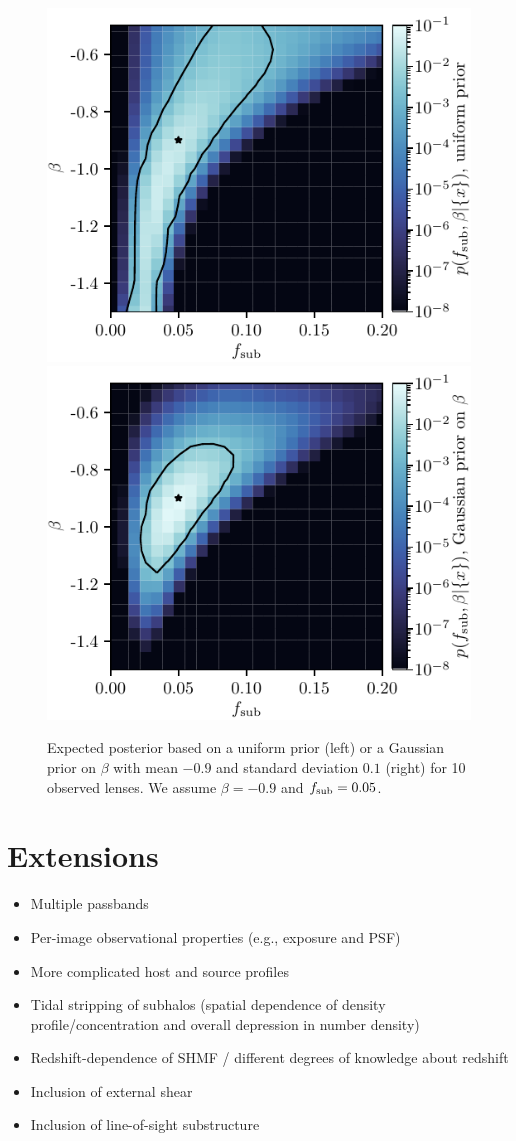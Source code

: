 \documentclass[twocolumn]{aastex62}
\begin{document}
\begin{figure}
\centering
\includegraphics[height=0.4\textwidth]{figures/posterior_uniform}
\includegraphics[height=0.4\textwidth]{figures/posterior_narrow}
\caption{Expected posterior based on a uniform prior (left) or a Gaussian prior on $\beta$ with mean $-0.9$ and standard deviation $0.1$ (right) for 10 observed lenses. We assume $\beta = -0.9$ and $f_{\mathrm{sub}} = 0.05$. }
\label{fig:bayesian_post}
\end{figure}


\section{Extensions}
\label{sec:extensions}

\begin{itemize}
\item Multiple passbands
\item Per-image observational properties (e.g., exposure and PSF)
\item More complicated host and source profiles
\item Tidal stripping of subhalos (spatial dependence of density profile/concentration and overall depression in number density)
\item Redshift-dependence of SHMF / different degrees of knowledge about redshift
\item Inclusion of external shear
\item Inclusion of line-of-sight substructure
\end{itemize}
\end{document}
